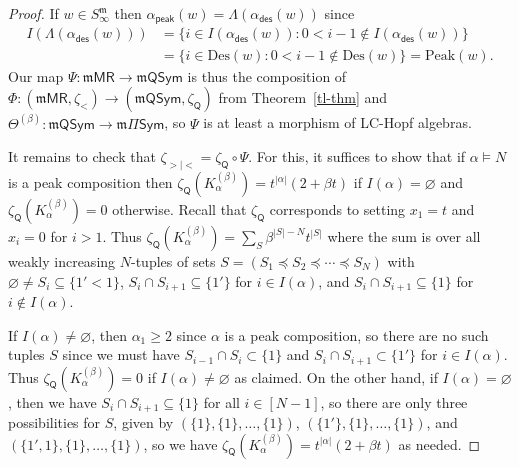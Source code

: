 \documentclass[11pt]{article}
\theoremstyle{definition}
\numberwithin{equation}{section}
\numberwithin{equation}{section}
\newcommand{\fk}{\mathfrak}
\newcommand{\ba}{\begin{aligned}}
\newcommand{\ea}{\end{aligned}}
\newcommand{\Des}{\mathrm{Des}}
\newcommand{\zetaq}{\zeta_{\mathsf{Q}}}
\newcommand{\Sym}{\mathsf{Sym}}
\newcommand{\QSymQ}{\Pi\Sym}
\newcommand{\mQSymQ}{\mathfrak{m}\QSymQ}
\newcommand{\mMPR}{\mathfrak{m}\mathsf{MR}}
\newcommand{\ttheta}{\Theta^{(\beta)}}
\newcommand{\mQSym}{\mathfrak{m}\mathsf{QSym}}
\newcommand{\Sm}{S^{\fk m}}
\newcommand{\PeakSet}{\mathrm{Peak}}
\newcommand{\cC}{\alpha_{\mathsf{des}}}
\newcommand{\cD}{\alpha_{\mathsf{peak}}}
\begin{document}
\begin{proof}
If $w \in \Sm_\infty$ then 
 $\cD(w) = \Lambda(\cC(w))$ since
 \[
 \ba 
 I( \Lambda(\cC(w))) &= \{ i \in I(\cC(w)) : 0 < i-1 \notin I(\cC(w))\}\\& =  \{ i \in \Des(w) : 0 < i-1 \notin \Des(w)\}= \PeakSet(w)  .\ea\]
Our map $\Psi : \mMPR \to \mQSym$ is thus the composition of 
$\Phi : (\mMPR,\zeta_{<}) \to (\mQSym, \zetaq)$ from Theorem~\ref{tl-thm} and $\ttheta : \mQSym \to \mQSymQ$,
so $\Psi$ is at least a morphism of LC-Hopf algebras. 

It remains to check that $\zeta_{>|<} = \zetaq\circ \Psi$. For this,  it 
suffices to show that if $\alpha\vDash N$ is a peak composition then
  $ \zetaq(K^{(\beta)}_\alpha) = t^{|\alpha|}(2+\beta t)$ if $I(\alpha) = \varnothing$ and $ \zetaq(K^{(\beta)}_\alpha) =0$ otherwise.
Recall that $\zetaq$ corresponds to setting $x_1=t$ and $x_i=0$ for $i>1$.
Thus
$
\zetaq(K^{(\beta)}_\alpha)  = \sum_{S} \beta^{|S|-N} t^{|S|}
$ where the sum is over all weakly increasing $N$-tuples of sets $S= (S_1\preceq S_2 \preceq \cdots \preceq S_N)$ with $\varnothing\neq S_i \subseteq \{1'<1\}$,  $S_i \cap S_{i+1} \subseteq \{1'\}$ for $i \in I(\alpha)$, and $S_i \cap S_{i+1} \subseteq \{1\}$ for $i \notin I(\alpha)$. 

If $I(\alpha) \neq \varnothing$,  then $\alpha_1 \geq 2$ since $\alpha$ is a peak composition, so there are no such tuples $S$ since we must have $S_{i-1} \cap S_i \subset \{1\}$ and $S_i \cap S_{i+1} \subset \{1'\}$ for $i \in I(\alpha)$. Thus $\zetaq(K^{(\beta)}_\alpha) = 0$ if $I(\alpha) \neq \varnothing $ as claimed.
%
On the other hand, if $I(\alpha) = \varnothing$, then we have $S_i \cap S_{i+1} \subseteq \{1\}$ for all $i \in [N-1]$, so there
are only three possibilities for $S$, given by 
$( \{1\}, \{1\},\dots,\{1\})$, $( \{1'\}, \{1\},\dots,\{1\})$, and  $( \{1',1\}, \{1\},\dots,\{1\})$,
so we have $ \zetaq(K^{(\beta)}_\alpha) = t^{|\alpha|}(2+\beta t)$ as needed.
\end{proof}
\end{document}
